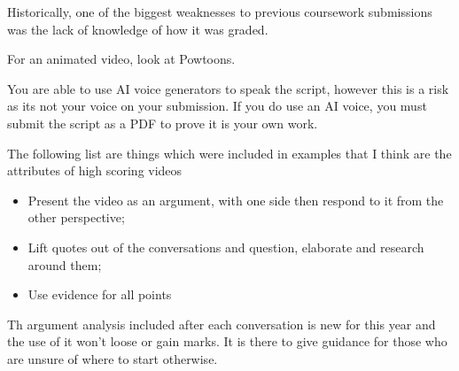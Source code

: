 
Historically, one of the biggest weaknesses to previous coursework submissions was the lack of knowledge of how it was graded. 

For an animated video, look at Powtoons.

You are able to use AI voice generators to speak the script, however this is a risk as its not your voice on your submission. If you do use an AI voice, you must submit the script as a PDF to prove it is your own work.

The following list are things which were included in examples that I think are the attributes of high scoring videos
\begin{itemize}
    \item Present the video as an argument, with one side then respond to it from the other perspective;
    \item Lift quotes out of the conversations and question, elaborate and research around them;
    \item Use evidence for all points
\end{itemize}

Th argument analysis included after each conversation is new for this year and the use of it won't loose or gain marks. It is there to give guidance for those who are unsure of where to start otherwise.